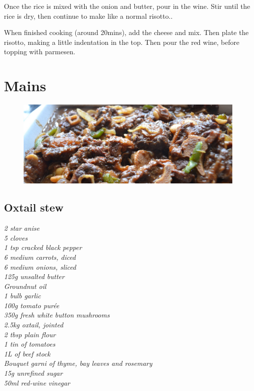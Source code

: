\documentclass{tufte-book}
\begin{document}
Once the rice is mixed with the onion and butter, pour in the wine. Stir until the rice is dry, then continue to make like a normal risotto..

When finished cooking (around 20mins), add the cheese and mix. Then plate the risotto, making a little indentation in the top. Then pour the red wine, before topping with parmesen. 



\chapter{Mains}

\begin{figure}[h]
  \includegraphics[width=\linewidth]{oxtailstew.jpg}%
\end{figure}

\section{Oxtail stew}

\smallskip
\emph{2 star anise 
\\5 cloves 
\\1 tsp cracked black pepper 
\\6 medium carrots, diced
\\6 medium onions, sliced
\\125g unsalted butter 
\\Groundnut oil  
\\1 bulb garlic 
\\100g tomato pur\'ee
\\350g fresh white button mushrooms   
\\2.5kg oxtail, jointed
\\2 tbsp plain flour 
\\1 tin of tomatoes
\\1L of beef stock
\\Bouquet garni of thyme, bay leaves and rosemary
\\15g unrefined sugar 
\\50ml red-wine vinegar}
\end{document}
